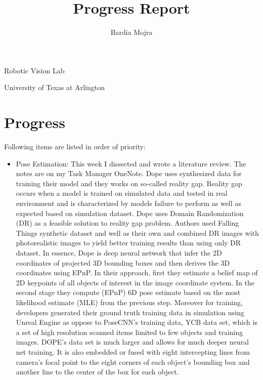 \documentclass[11pt]{article}
\title{Progress Report}
\author{Bardia Mojra}
\begin{document}
\maketitle
\thispagestyle{empty}

\begin{center}
	\bigskip
	\bigskip
	Robotic Vision Lab

	University of Texas at Arlington
\end{center}

\newpage

\section{Progress}
Following items are listed in order of priority:
\begin{itemize}

	\item Pose Estimation: This week I dissected \cite{Dope} and wrote a literature review. The notes are on my Task Manager OneNote. Dope uses synthesized data for training their model and they works on so-called reality gap. Reality gap occurs when a model is trained on simulated data and tested in real environment and is characterized by models failure to perform as well as expected based on simulation dataset.
	      Dope uses Domain Randomization (DR) as a feasible solution to reality gap problem. Authors used Falling Things synthetic dataset and well as their own and combined DR images with photorealistic images to yield better training results than using only DR dataset. In essence, Dope is deep neural network that infer the 2D coordinates of projected 3D bounding boxes and then derives the 3D coordinates using EPnP.
	      In their approach, first they estimate a belief map of 2D keypoints of
	      all objects of interest in the image coordinate system. In the second
	      stage they compute (EPnP) 6D pose estimate based on the most likelihood
	      estimate (MLE) from the previous step.
	      Moreover for training, developers generated their ground truth training
	      data in simulation using Unreal Engine as oppose to PoseCNN's training
	      data, YCB data set, which is a set of high resolution scanned items limited to few objects and training images. DOPE's data set is much larger and allows for much deeper neural net training. It is also embedded or fused with eight intercepting lines from camera's focal point to the eight corners of each object's bounding box and another line to the center of the box for each object.


\end{itemize}
\end{document}

